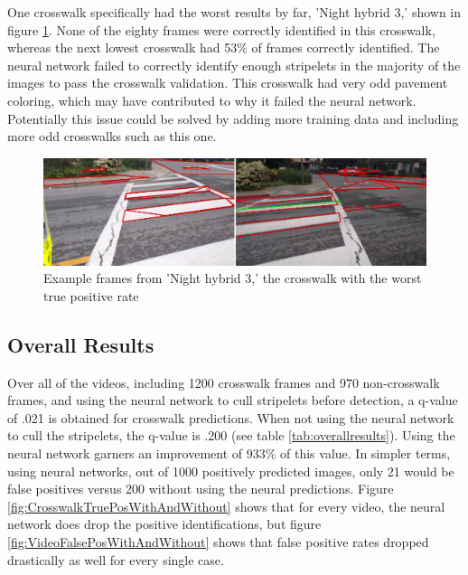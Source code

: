 One crosswalk specifically had the worst results by far, 'Night hybrid 3,' shown in figure \ref{fig:worstcwalk}. None of the eighty frames were correctly identified in this crosswalk, whereas the next lowest crosswalk had 53\% of frames correctly identified. The neural network failed to correctly identify enough stripelets in the majority of the images to pass the crosswalk validation. This crosswalk had very odd pavement coloring, which may have contributed to why it failed the neural network.  Potentially this issue could be solved by adding more training data and including more odd crosswalks such as this one. 

\begin{figure}[t]
\begin{center}
\includegraphics[width=14cm]{figures/WorstCwalk.png}
\captionfonts
\caption{Example frames from 'Night hybrid 3,' the crosswalk with the worst true positive rate}
\label{fig:worstcwalk}
\end{center}
\end{figure}

\clearpage

\subsection{Overall Results}
Over all of the videos, including 1200 crosswalk frames and 970 non-crosswalk frames, and using the neural network to cull stripelets before detection, a q-value of .021 is obtained for crosswalk predictions. When not using the neural network to cull the stripelets, the q-value is .200 (see table \ref{tab:overallresults}). Using the neural network garners an improvement of 933\% of this value. In simpler terms, using neural networks, out of 1000 positively predicted images, only 21 would be false positives versus 200 without using the neural predictions. Figure \ref{fig:CrosswalkTruePosWithAndWithout} shows that for every video, the neural network does drop the positive identifications, but figure \ref{fig:VideoFalsePosWithAndWithout} shows that false positive rates dropped drastically as well for every single case. 


